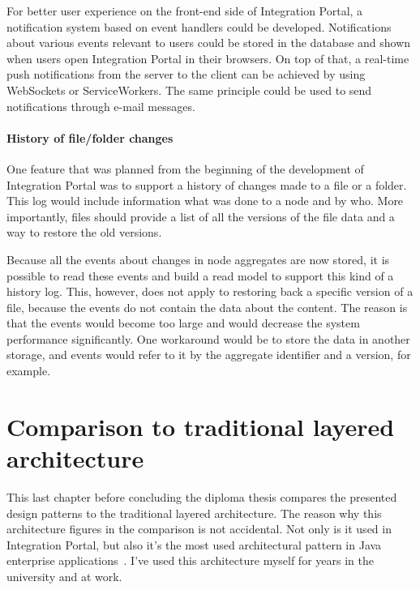 \documentclass{book}
\begin{document}
For better user experience on the front-end side of Integration Portal,
a notification system based on event handlers could be developed.
Notifications about various events relevant to users could be stored in
the database and shown when users open Integration Portal in their
browsers. On top of that, a real-time push notifications from the server
to the client can be achieved by using WebSockets or ServiceWorkers. The
same principle could be used to send notifications through e-mail
messages.

\paragraph{History of file/folder
changes}\label{history-of-filefolder-changes}

One feature that was planned from the beginning of the development of
Integration Portal was to support a history of changes made to a file or
a folder. This log would include information what was done to a node and
by who. More importantly, files should provide a list of all the
versions of the file data and a way to restore the old versions.

Because all the events about changes in node aggregates are now stored,
it is possible to read these events and build a read model to support
this kind of a history log. This, however, does not apply to restoring
back a specific version of a file, because the events do not contain the
data about the content. The reason is that the events would become too
large and would decrease the system performance significantly. One
workaround would be to store the data in another storage, and events
would refer to it by the aggregate identifier and a version, for
example.


\section{Comparison to traditional layered
architecture}\label{comparison-to-traditional-layered-architecture}

This last chapter before concluding the diploma thesis compares the
presented design patterns to the traditional layered architecture. The
reason why this architecture figures in the comparison is not
accidental. Not only is it used in Integration Portal, but also it's the
most used architectural pattern in Java enterprise applications~\cite{oreilly}. I've used this architecture myself for years in the
university and at work.
\end{document}
